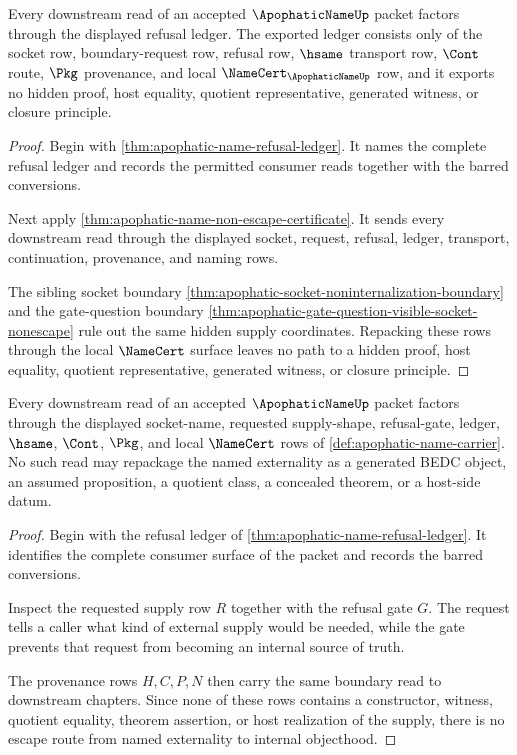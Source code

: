 \begin{theorem}
\label{thm:apophatic-name-ledger-nonescape}
Every downstream read of an accepted $\ApophaticNameUp$ packet factors through the displayed refusal ledger. The exported ledger consists only of the socket row, boundary-request row, refusal row, $\hsame$ transport row, $\Cont$ route, $\Pkg$ provenance, and local $\NameCert_{\ApophaticNameUp}$ row, and it exports no hidden proof, host equality, quotient representative, generated witness, or closure principle.
\end{theorem}
\begin{proof}
Begin with \autoref{thm:apophatic-name-refusal-ledger}. It names the complete refusal ledger and records the permitted consumer reads together with the barred conversions.

Next apply \autoref{thm:apophatic-name-non-escape-certificate}. It sends every downstream read through the displayed socket, request, refusal, ledger, transport, continuation, provenance, and naming rows.

The sibling socket boundary \autoref{thm:apophatic-socket-noninternalization-boundary} and the gate-question boundary \autoref{thm:apophatic-gate-question-visible-socket-nonescape} rule out the same hidden supply coordinates. Repacking these rows through the local $\NameCert$ surface leaves no path to a hidden proof, host equality, quotient representative, generated witness, or closure principle.
\end{proof}

\begin{theorem}
\label{thm:apophatic-name-non-escape-certificate}
Every downstream read of an accepted $\ApophaticNameUp$ packet factors through the displayed socket-name, requested supply-shape, refusal-gate, ledger, $\hsame$, $\Cont$, $\Pkg$, and local $\NameCert$ rows of \autoref{def:apophatic-name-carrier}. No such read may repackage the named externality as a generated BEDC object, an assumed proposition, a quotient class, a concealed theorem, or a host-side datum.
\end{theorem}
\begin{proof}
Begin with the refusal ledger of \autoref{thm:apophatic-name-refusal-ledger}. It identifies the complete consumer surface of the packet and records the barred conversions.

Inspect the requested supply row $R$ together with the refusal gate $G$. The request tells a caller what kind of external supply would be needed, while the gate prevents that request from becoming an internal source of truth.

The provenance rows $H,C,P,N$ then carry the same boundary read to downstream chapters. Since none of these rows contains a constructor, witness, quotient equality, theorem assertion, or host realization of the supply, there is no escape route from named externality to internal objecthood.
\end{proof}

